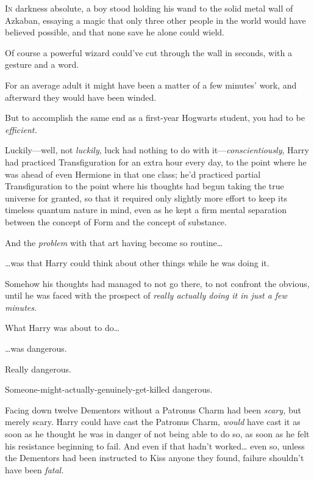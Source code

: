 
\lettrine{I}{n} darkness absolute, a boy stood holding his wand to the solid metal wall of
Azkaban, essaying a magic that only three other people in the world would have
believed possible, and that none save he alone could wield.

Of course a powerful wizard could've cut through the wall in seconds, with a
gesture and a word.

For an average adult it might have been a matter of a few minutes' work, and
afterward they would have been winded.

But to accomplish the same end as a first-year Hogwarts student, you had to be
\emph{efficient.}

Luckily---well, not \emph{luckily}, luck had nothing to do with
it---\emph{conscientiously}, Harry had practiced Transfiguration for an extra
hour every day, to the point where he was ahead of even Hermione in that one
class; he'd practiced partial Transfiguration to the point where his thoughts
had begun taking the true universe for granted, so that it required only
slightly more effort to keep its timeless quantum nature in mind, even as he
kept a firm mental separation between the concept of Form and the concept of
substance.

And the \emph{problem} with that art having become so routine{\ldots}

{\ldots}was that Harry could think about other things while he was doing it.

Somehow his thoughts had managed to not go there, to not confront the obvious,
until he was faced with the prospect of \emph{really actually doing it in just
a few minutes}.

What Harry was about to do{\ldots}

{\ldots}was dangerous.

Really dangerous.

Someone-might-actually-genuinely-get-killed dangerous.

Facing down twelve Dementors without a Patronus Charm had been \emph{scary,}
but merely scary. Harry could have cast the Patronus Charm, \emph{would} have
cast it as soon as he thought he was in danger of not being able to do so, as
soon as he felt his resistance beginning to fail. And even if that hadn't
worked{\ldots} even so, unless the Dementors had been instructed to Kiss anyone
they found, failure shouldn't have been \emph{fatal.}

